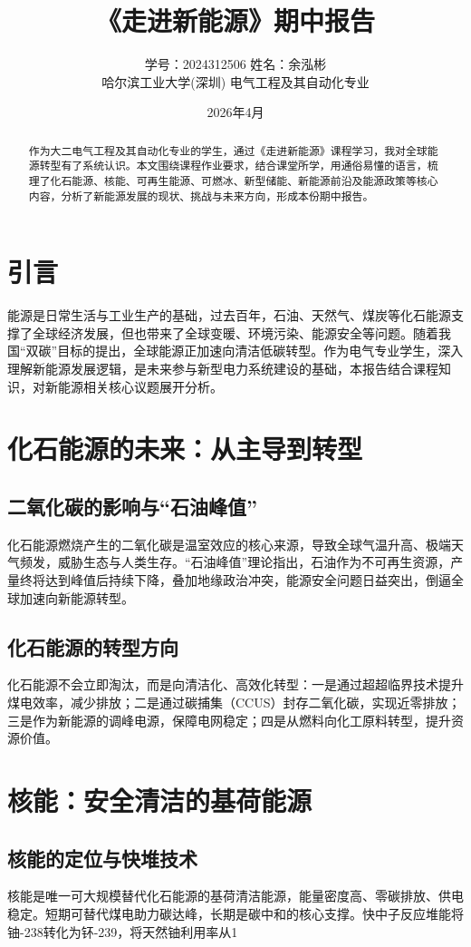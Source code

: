 \documentclass[UTF8,a4paper,12pt]{article}
\title{\bfseries 《走进新能源》期中报告}
\author{学号：2024312506 \quad 姓名：余泓彬 \\ 哈尔滨工业大学(深圳) 电气工程及其自动化专业}
\date{2026年4月}
\begin{document}
\maketitle

\begin{abstract}
作为大二电气工程及其自动化专业的学生，通过《走进新能源》课程学习，我对全球能源转型有了系统认识。本文围绕课程作业要求，结合课堂所学，用通俗易懂的语言，梳理了化石能源、核能、可再生能源、可燃冰、新型储能、新能源前沿及能源政策等核心内容，分析了新能源发展的现状、挑战与未来方向，形成本份期中报告。
\end{abstract}

\section{引言}
能源是日常生活与工业生产的基础，过去百年，石油、天然气、煤炭等化石能源支撑了全球经济发展，但也带来了全球变暖、环境污染、能源安全等问题。随着我国“双碳”目标的提出，全球能源正加速向清洁低碳转型。作为电气专业学生，深入理解新能源发展逻辑，是未来参与新型电力系统建设的基础，本报告结合课程知识，对新能源相关核心议题展开分析。

\section{化石能源的未来：从主导到转型}
\subsection{二氧化碳的影响与“石油峰值”}
化石能源燃烧产生的二氧化碳是温室效应的核心来源，导致全球气温升高、极端天气频发，威胁生态与人类生存。“石油峰值”理论指出，石油作为不可再生资源，产量终将达到峰值后持续下降，叠加地缘政治冲突，能源安全问题日益突出，倒逼全球加速向新能源转型。

\subsection{化石能源的转型方向}
化石能源不会立即淘汰，而是向清洁化、高效化转型：一是通过超超临界技术提升煤电效率，减少排放；二是通过碳捕集（CCUS）封存二氧化碳，实现近零排放；三是作为新能源的调峰电源，保障电网稳定；四是从燃料向化工原料转型，提升资源价值。

\section{核能：安全清洁的基荷能源}
\subsection{核能的定位与快堆技术}
核能是唯一可大规模替代化石能源的基荷清洁能源，能量密度高、零碳排放、供电稳定。短期可替代煤电助力碳达峰，长期是碳中和的核心支撑。快中子反应堆能将铀-238转化为钚-239，将天然铀利用率从1%
\end{document}
